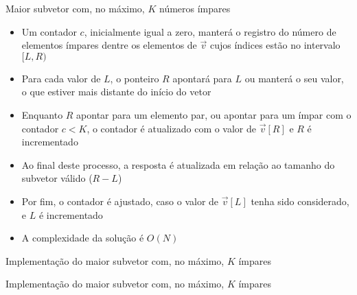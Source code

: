 \begin{frame}[fragile]{Maior subvetor com, no máximo, $K$ números ímpares}

    \begin{itemize}
        \item Um contador $c$, inicialmente igual a zero, manterá o registro do número de elementos
            ímpares dentre os elementos de $\vec{v}$ cujos índices estão no intervalo $[L, R)$

        \item Para cada valor de $L$, o ponteiro $R$ apontará para $L$ ou manterá o seu valor, o 
            que estiver mais distante do início do vetor

        \item Enquanto $R$ apontar para um elemento par, ou apontar para um ímpar com o contador
            $c < K$, o contador é atualizado com o valor de $\vec{v}[R]$ e $R$ é incrementado

        \item Ao final deste processo, a resposta é atualizada em relação ao tamanho do subvetor
            válido ($R - L$)

        \item Por fim, o contador é ajustado, caso o valor de $\vec{v}[L]$ tenha sido
            considerado, e $L$ é incrementado

        \item A complexidade da solução é $O(N)$
    \end{itemize}

\end{frame}



\begin{frame}[fragile]{Implementação do maior subvetor com, no máximo, $K$ ímpares}
\end{frame}

\begin{frame}[fragile]{Implementação do maior subvetor com, no máximo, $K$ ímpares}
\end{frame}


